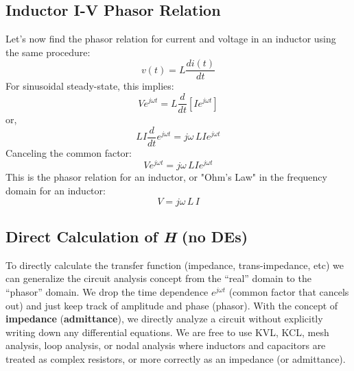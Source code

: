 \subsection{Inductor I-V Phasor Relation}
Let's now find the phasor relation for current and voltage in an inductor using the same procedure:
    \begin{equation}
        v(t) = L\frac{{di(t)}}{{dt}}
    \end{equation} 
For sinusoidal steady-state, this implies:
    \begin{equation}
        V{e^{j\omega t}} = L\frac{d}{{dt}}[I{e^{j\omega t}}]
    \end{equation}
or,
    \begin{equation}
        LI\frac{d}{{dt}}{e^{j\omega t}} = j\omega \,LI{e^{j\omega t}}
    \end{equation}
Canceling the common factor:
    \begin{equation}
        V{e^{j\omega t}} = j\omega \,LI{e^{j\omega t}}
    \end{equation}
This is the phasor relation for an inductor, or "Ohm's Law" in the frequency domain for an inductor:
    \begin{equation}
        V = j\omega \,L\,I
    \end{equation}
\subsection{Direct Calculation of \textit{H} (no DEs)}
To directly calculate the transfer function (impedance, trans-impedance, etc) we can generalize the circuit analysis concept from the “real” domain to the “phasor” domain.   We drop the time dependence $e^{j\omega t}$ (common factor that cancels out) and just keep track of amplitude and phase (phasor).  With the concept of \textbf{impedance} (\textbf{admittance}), we directly analyze a circuit without explicitly writing down any differential equations.  We are free to use KVL, KCL, mesh analysis, loop analysis, or nodal analysis where inductors and capacitors are treated as complex resistors, or more correctly as an impedance (or admittance).
\newpage
